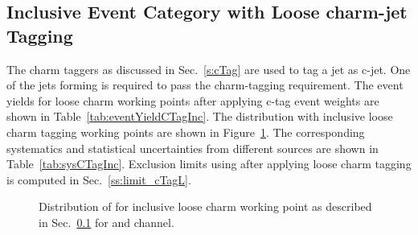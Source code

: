 \subsection{Inclusive Event Category with Loose charm-jet Tagging}
\label{ss:mjj_cTagL}
The charm taggers as discussed in Sec.~\ref{s:cTag} are used to tag a jet 
as c-jet. One of the jets forming \mjj is required to pass the charm-tagging
requirement. The event yields for loose charm working points after applying 
c-tag event weights are shown in Table~\ref{tab:eventYieldCTagInc}. The 
\mjj distribution with inclusive loose charm tagging working points are 
shown in Figure~\ref{fig:mjj_cTagL}. The corresponding systematics and statistical 
uncertainties from different sources are shown in Table~\ref{tab:sysCTagInc}. 
Exclusion limits using \mjj after applying loose charm tagging is computed 
in Sec.~\ref{ss:limit_cTagL}.
    \begin{figure}
    \centering  
    \caption{Distribution of \mjj for inclusive loose charm working point as
    described in Sec.~\ref{ss:mjj_cTagL} for \mujets and \ejets channel.}
    \label{fig:mjj_cTagL}
    \end{figure}
